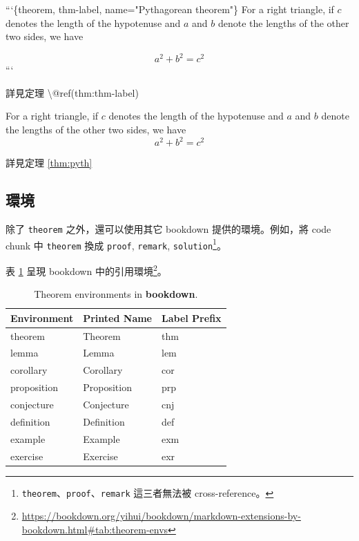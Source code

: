 \documentclass[oneside]{book}
\newenvironment{Shaded}{\begin{snugshade}}{\end{snugshade}}
\newcommand{\BaseNTok}[1]{\textcolor[rgb]{0.00,0.00,0.81}{#1}}
\newcommand{\NormalTok}[1]{#1}
\renewcommand{\href}[2]{#2\footnote{\url{#1}}}
\theoremstyle{definition}
\theoremstyle{definition}
\theoremstyle{definition}
\theoremstyle{remark}
\let\BeginKnitrBlock\begin \let\EndKnitrBlock\end
\begin{document}
\begin{Shaded}
\begin{Highlighting}[]
\BaseNTok{```\{theorem, thm-label, name="Pythagorean theorem"\}}
\BaseNTok{For a right triangle, if $c$ denotes the length of the hypotenuse}
\BaseNTok{and $a$ and $b$ denote the lengths of the other two sides, we have}

\BaseNTok{$$a^2 + b^2 = c^2$$}
\BaseNTok{```}

\NormalTok{詳見定理 \textbackslash{}@ref(thm:thm-label)}
\end{Highlighting}
\end{Shaded}

\BeginKnitrBlock{theorem}[Pythagorean theorem]
\protect\hypertarget{thm:pyth}{}{\label{thm:pyth} {} }For a right triangle, if \(c\) denotes the length of the hypotenuse
and \(a\) and \(b\) denote the lengths of the other two sides, we have
\[a^2 + b^2 = c^2\]
\EndKnitrBlock{theorem}

詳見定理 \ref{thm:pyth}

\hypertarget{environment}{%
\subsection{環境}\label{environment}}

除了 \texttt{theorem} 之外，還可以使用其它 bookdown 提供的環境。例如，將 code chunk 中 \texttt{theorem} 換成 \texttt{proof}, \texttt{remark}, \texttt{solution}\footnote{\texttt{theorem}、\texttt{proof}、\texttt{remark} 這三者無法被 cross-reference。}。

表 \ref{tab:theorem-envs} 呈現 bookdown 中的\href{https://bookdown.org/yihui/bookdown/markdown-extensions-by-bookdown.html\#tab:theorem-envs}{引用環境}。



\begin{table}

\caption{\label{tab:theorem-envs}Theorem environments in \textbf{bookdown}.}
\centering
\begin{tabular}[t]{lll}
\toprule
Environment & Printed Name & Label Prefix\\
\midrule
theorem & Theorem & thm\\
lemma & Lemma & lem\\
corollary & Corollary & cor\\
proposition & Proposition & prp\\
conjecture & Conjecture & cnj\\
\addlinespace
definition & Definition & def\\
example & Example & exm\\
exercise & Exercise & exr\\
\bottomrule
\end{tabular}
\end{table}
\end{document}
